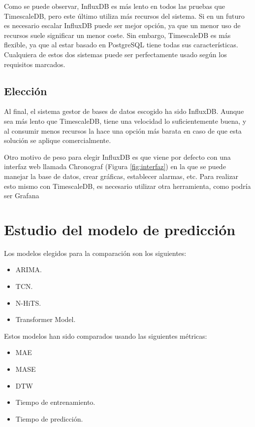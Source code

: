 Como se puede observar, InfluxDB es más lento en todos las pruebas que TimescaleDB, pero este último utiliza más 
recursos del sistema. Si en un futuro es necesario escalar InfluxDB puede ser mejor opción, ya que un menor uso de 
recursos suele significar un menor coste. Sin embargo, TimescaleDB es más flexible, ya que al estar basado en PostgreSQL 
tiene todas sus características. Cualquiera de estos dos sistemas puede ser perfectamente usado según los requisitos marcados.

\subsection{Elección}

Al final, el sistema gestor de bases de datos escogido ha sido InfluxDB. Aunque sea más lento que TimescaleDB, tiene
una velocidad lo suficientemente buena, y al consumir menos recursos la hace una opción más barata en caso de que 
esta solución se aplique comercialmente.

Otro motivo de peso para elegir InfluxDB es que viene por defecto con una interfaz web llamada Chronograf 
(Figura \ref*{fig:interfaz}) en la que se puede manejar la base de datos, crear gráficas, establecer alarmas, etc. 
Para realizar esto mismo con TimescaleDB, es necesario utilizar otra herramienta, como podría ser Grafana \cite{Web:Grafana:Docs}


\section{Estudio del modelo de predicción}

Los modelos elegidos para la comparación son los siguientes:
\begin{itemize}
    \item ARIMA.
    \item TCN.
    \item N-HiTS.
    \item Transformer Model.
\end{itemize}

Estos modelos han sido comparados usando las siguientes métricas:
\begin{itemize}
    \item MAE 
    \item MASE 
    \item DTW
    \item Tiempo de entrenamiento.
    \item Tiempo de predicción.
\end{itemize}

